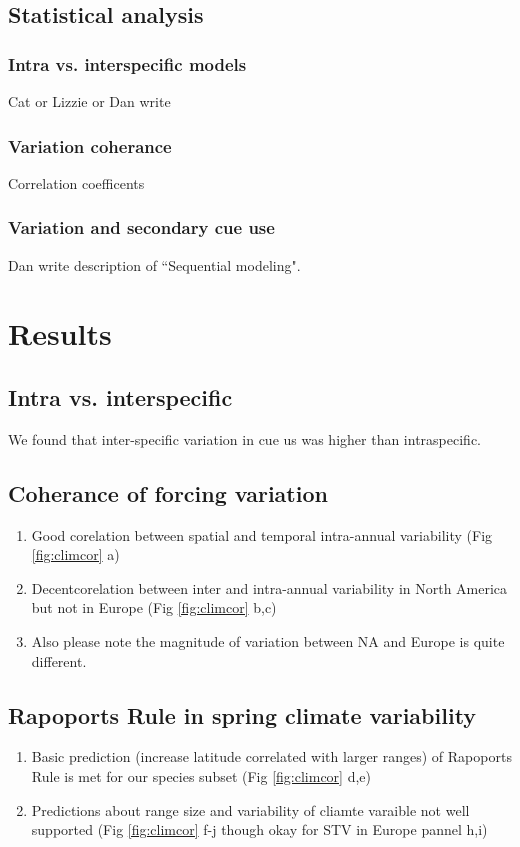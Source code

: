 \documentclass[11pt]{article}\usepackage[]{graphicx}\usepackage[]{color}
\begin{document}
\subsection*{Statistical analysis}
\subsubsection*{Intra vs. interspecific models}
Cat or Lizzie or Dan write

\subsubsection*{Variation coherance}
Correlation coefficents


\subsubsection*{Variation and secondary cue use}
Dan write description of ``Sequential modeling". 

\section*{Results}
\subsection*{Intra vs. interspecific}
We found that inter-specific variation in cue us was higher than intraspecific.
\subsection*{Coherance of forcing variation}
\begin{enumerate}
\item Good corelation between spatial and temporal intra-annual variability (Fig \ref{fig:climcor} a)
\item Decentcorelation between inter and intra-annual variability in North America but not in Europe  (Fig \ref{fig:climcor} b,c)
\item Also please note the magnitude of variation between NA and Europe is quite different.
\end{enumerate}

\subsection*{Rapoports Rule in spring climate variability}
\begin{enumerate}
\item Basic prediction (increase latitude correlated with larger ranges) of Rapoports Rule is met for our species subset (Fig \ref{fig:climcor} d,e)
\item Predictions about range size and variability of cliamte varaible not well supported
(Fig \ref{fig:climcor} f-j though okay for STV in Europe pannel h,i)
\end{enumerate}
\end{document}
